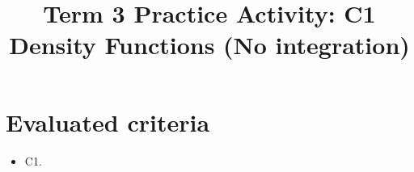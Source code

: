 \makeatletter
{}
\makeatother	



\title{Term 3 Practice Activity: C1 Density Functions (No integration)}
\author{}
\date{}


	\maketitle

	\setcounter{tocdepth}{1}
	\setcounter{secnumdepth}{2}
	\tableofcontents

	\section*{Evaluated criteria}
	\begin{itemize}
		\item C1.
	\end{itemize}

	
	
	
	

\newcommand{\COneGraph}[7]{
\begin{center}
\begin{tikzpicture}
\pgfmathsetmacro{\supportA}{#1}
\pgfmathsetmacro{\supportB}{#2}
\pgfmathsetmacro{\pad}{0.12*(\supportB-\supportA)}
\begin{axis}[
  width=9cm,
  height=5cm,
  axis lines=left,
  xlabel={$x$},
  ylabel={$f(x)$},
  xmin={\supportA-\pad},
  xmax={\supportB+\pad},
  ymin=0,
  ymax=#7,
  grid=both,
  xtick={#6}
]
\addplot[domain=#1:#2, samples=160, draw=none, fill=blue!20, fill opacity=0.35] {#3} \closedcycle;
\addplot[domain=#4:#5, samples=160, draw=none, fill=blue!60, fill opacity=0.55] {#3} \closedcycle;
\addplot[smooth, domain=#1:#2, samples=160, thick] {#3};
\end{axis}
\end{tikzpicture}
\end{center}
}

\newcommand{\COneCompareGraph}[6]{
\begin{center}
\begin{tikzpicture}
\begin{axis}[
  width=9cm,
  height=5cm,
  axis lines=left,
  xlabel={$x$},
  ylabel={$f(x)$},
  xmin=#1,
  xmax=#2,
  ymin=0,
  ymax=#6,
  grid=both,
  xtick={0,1,2,3,4,5}
]
\addplot[smooth, domain=#3:#4, samples=150, thick, blue] {#5};
\addplot[smooth, domain=#3:#4, samples=150, thick, red, dashed] {#5*1.6};
\end{axis}
\end{tikzpicture}
\end{center}
}

